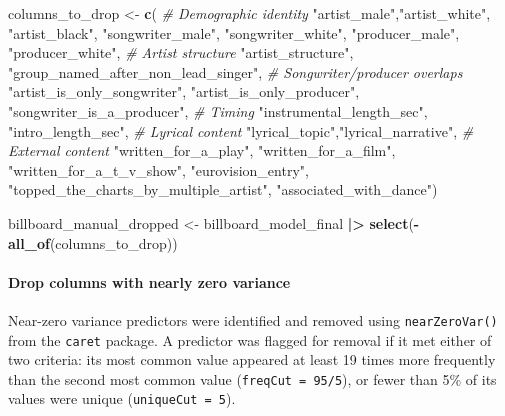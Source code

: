 \documentclass[
]{article}
\newenvironment{Shaded}{\begin{snugshade}}{\end{snugshade}}
\newcommand{\CommentTok}[1]{\textcolor[rgb]{0.56,0.35,0.01}{\textit{#1}}}
\newcommand{\FunctionTok}[1]{\textcolor[rgb]{0.13,0.29,0.53}{\textbf{#1}}}
\newcommand{\NormalTok}[1]{#1}
\newcommand{\OtherTok}[1]{\textcolor[rgb]{0.56,0.35,0.01}{#1}}
\newcommand{\SpecialCharTok}[1]{\textcolor[rgb]{0.81,0.36,0.00}{\textbf{#1}}}
\newcommand{\StringTok}[1]{\textcolor[rgb]{0.31,0.60,0.02}{#1}}
\begin{document}
\begin{Shaded}
\begin{Highlighting}[]
\NormalTok{columns\_to\_drop }\OtherTok{\textless{}{-}} \FunctionTok{c}\NormalTok{(}
  \CommentTok{\# Demographic identity}
  \StringTok{"artist\_male"}\NormalTok{,}\StringTok{"artist\_white"}\NormalTok{, }\StringTok{"artist\_black"}\NormalTok{, }\StringTok{"songwriter\_male"}\NormalTok{, }\StringTok{"songwriter\_white"}\NormalTok{, }\StringTok{"producer\_male"}\NormalTok{, }\StringTok{"producer\_white"}\NormalTok{, }
  \CommentTok{\# Artist structure}
  \StringTok{"artist\_structure"}\NormalTok{, }\StringTok{"group\_named\_after\_non\_lead\_singer"}\NormalTok{,}
  \CommentTok{\# Songwriter/producer overlaps}
  \StringTok{"artist\_is\_only\_songwriter"}\NormalTok{, }\StringTok{"artist\_is\_only\_producer"}\NormalTok{, }\StringTok{"songwriter\_is\_a\_producer"}\NormalTok{,}
  \CommentTok{\# Timing}
  \StringTok{"instrumental\_length\_sec"}\NormalTok{,  }\StringTok{"intro\_length\_sec"}\NormalTok{,}
  \CommentTok{\# Lyrical content }
  \StringTok{"lyrical\_topic"}\NormalTok{,}\StringTok{"lyrical\_narrative"}\NormalTok{,}
  \CommentTok{\# External content}
  \StringTok{"written\_for\_a\_play"}\NormalTok{, }\StringTok{"written\_for\_a\_film"}\NormalTok{, }\StringTok{"written\_for\_a\_t\_v\_show"}\NormalTok{, }\StringTok{"eurovision\_entry"}\NormalTok{, }\StringTok{"topped\_the\_charts\_by\_multiple\_artist"}\NormalTok{, }\StringTok{"associated\_with\_dance"}\NormalTok{)}

\NormalTok{billboard\_manual\_dropped }\OtherTok{\textless{}{-}}\NormalTok{ billboard\_model\_final }\SpecialCharTok{|\textgreater{}}
  \FunctionTok{select}\NormalTok{(}\SpecialCharTok{{-}}\FunctionTok{all\_of}\NormalTok{(columns\_to\_drop))}
\end{Highlighting}
\end{Shaded}

\paragraph{Drop columns with nearly zero
variance}\label{drop-columns-with-nearly-zero-variance}

Near-zero variance predictors were identified and removed using
\texttt{nearZeroVar()} from the \texttt{caret} package. A predictor was
flagged for removal if it met either of two criteria: its most common
value appeared at least 19 times more frequently than the second most
common value (\texttt{freqCut\ =\ 95/5}), or fewer than 5\% of its
values were unique (\texttt{uniqueCut\ =\ 5}).
\end{document}
